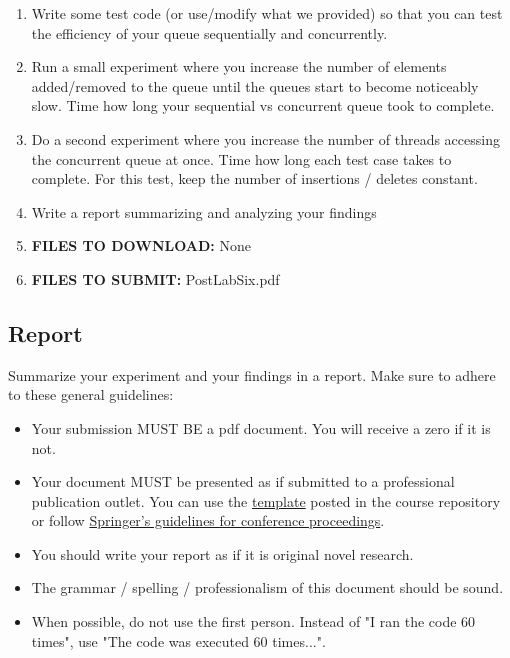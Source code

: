 \documentclass[paper=a4, fontsize=11pt, parskip=full]{scrartcl} %
\numberwithin{equation}{section} %
\numberwithin{figure}{section} %
\numberwithin{table}{section} %
\begin{document}
\begin{enumerate}
	\item Write some test code (or use/modify what we provided) so that you can test the efficiency of your queue sequentially and concurrently.
	\item Run a small experiment where you increase the number of elements added/removed to the queue until the queues start to become noticeably slow. Time how long your sequential vs concurrent queue took to complete.
	\item Do a second experiment where you increase the number of threads accessing the concurrent queue at once. Time how long each test case takes to complete. For this test, keep the number of insertions / deletes constant.
	\item Write a report summarizing and analyzing your findings
	\item \textbf{FILES TO DOWNLOAD:} None
	\item \textbf{FILES TO SUBMIT:} PostLabSix.pdf
\end{enumerate}

\subsection{Report}

Summarize your experiment and your findings in a report. Make sure to adhere to these general guidelines:

\begin{itemize}
	\item Your submission MUST BE a pdf document. You will receive a zero if it is not.
	\item Your document MUST be presented as if submitted to a professional publication outlet. You can use the \href{https://github.com/markfloryan/dsa1/blob/master/labs/WordPaperTemplate.zip}{template} posted in the course repository or follow \href{https://www.springer.com/us/computer-science/lncs/conference-proceedings-guidelines}{Springer's guidelines for conference proceedings}.
	\item You should write your report as if it is original novel research.
	\item The grammar / spelling / professionalism of this document should be sound.
	\item When possible, do not use the first person. Instead of "I ran the code 60 times", use "The code was executed 60 times...".
\end{itemize}
\end{document}
